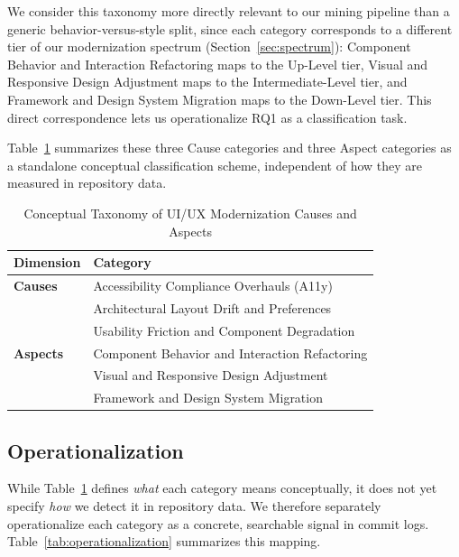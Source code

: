 \documentclass{article}
\begin{document}
We consider this taxonomy more directly relevant to our mining pipeline
than a generic behavior-versus-style split, since each category corresponds
to a different tier of our modernization spectrum
(Section~\ref{sec:spectrum}): Component Behavior and Interaction
Refactoring maps to the Up-Level tier, Visual and Responsive Design
Adjustment maps to the Intermediate-Level tier, and Framework and Design
System Migration maps to the Down-Level tier. This direct correspondence
lets us operationalize RQ1 as a classification task.

Table~\ref{tab:taxonomy} summarizes these three Cause categories and three
Aspect categories as a standalone conceptual classification scheme,
independent of how they are measured in repository data.

\begin{table}[htbp]
\centering
\caption{Conceptual Taxonomy of UI/UX Modernization Causes and Aspects}
\label{tab:taxonomy}
\begin{tabularx}{\textwidth}{l X}
\toprule
\textbf{Dimension} & \textbf{Category} \\
\midrule
\textbf{Causes} & Accessibility Compliance Overhauls (A11y) \\
& Architectural Layout Drift and Preferences \\
& Usability Friction and Component Degradation \\
\midrule
\textbf{Aspects} & Component Behavior and Interaction Refactoring \\
& Visual and Responsive Design Adjustment \\
& Framework and Design System Migration \\
\bottomrule
\end{tabularx}
\end{table}

\subsection{Operationalization}
\label{sec:operationalization}

While Table~\ref{tab:taxonomy} defines \emph{what} each category means
conceptually, it does not yet specify \emph{how} we detect it in
repository data. We therefore separately operationalize each category as a
concrete, searchable signal in commit logs.
Table~\ref{tab:operationalization} summarizes this mapping.
\end{document}
